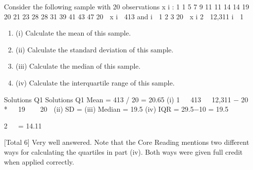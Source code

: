 \documentclass[a4paper,12pt]{article}
\begin{document}
Consider the following sample with 20 observations x i :
1 1 5 7 9 11 11 14 14 19
20 21 23 28 28 31 39 41 43 47
20
 x i  413 and
i  1
2
3
20
 x i 2  12,311
i  1

\begin{enumerate}
\item (i) Calculate the mean of this sample. 
\item (ii) Calculate the standard deviation of this sample. 
\item (iii) Calculate the median of this sample. 
\item (iv) Calculate the interquartile range of this sample.
\end{enumerate}


Solutions
Q1
Solutions
Q1
Mean = 413 / 20 = 20.65
(i)
1 
 413 
 12,311 − 20 * 

19  
 20 
(ii) SD =
(iii) Median = 19.5
(iv) IQR = 29.5−10 = 19.5

2 
 = 14.11
 



[Total 6]
Very well answered. Note that the Core Reading mentions two different ways
for calculating the quartiles in part (iv). Both ways were given full credit when
applied correctly.
\end{document}
